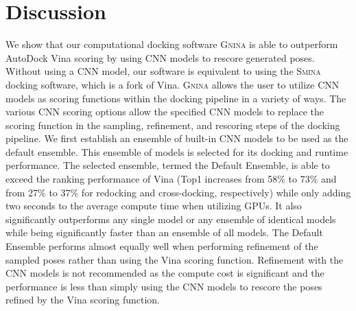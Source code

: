 \documentclass[linenumbers,doublespacing]{bmcart}
\begin{document}
\section{Discussion}
We show that our computational docking software \textsc{Gnina} is able to outperform AutoDock Vina scoring by using CNN models to rescore generated poses. Without using a CNN model, our software is equivalent to using the \textsc{Smina} docking software, which is a fork of Vina. \textsc{Gnina} allows the user to utilize CNN models as scoring functions within the docking pipeline in a variety of ways. The various CNN scoring options allow the specified CNN models to replace the scoring function in the sampling, refinement, and rescoring steps of the docking pipeline. We first establish an ensemble of built-in CNN models to be used as the default ensemble. This ensemble of models is selected for its docking and runtime performance. The selected ensemble, termed the Default Ensemble, is able to exceed the ranking performance of Vina (Top1 increases from 58\% to 73\% and from 27\% to 37\% for redocking and cross-docking, respectively) while only adding two seconds to the average compute time when utilizing GPUs. It also significantly outperforms any single model or any ensemble of identical models while being significantly faster than an ensemble of all models. The Default Ensemble performs almost equally well when performing refinement of the sampled poses rather than using the Vina scoring function. Refinement with the CNN models is not recommended as the compute cost is significant and the performance is less than simply using the CNN models to rescore the poses refined by the Vina scoring function.
\end{document}
